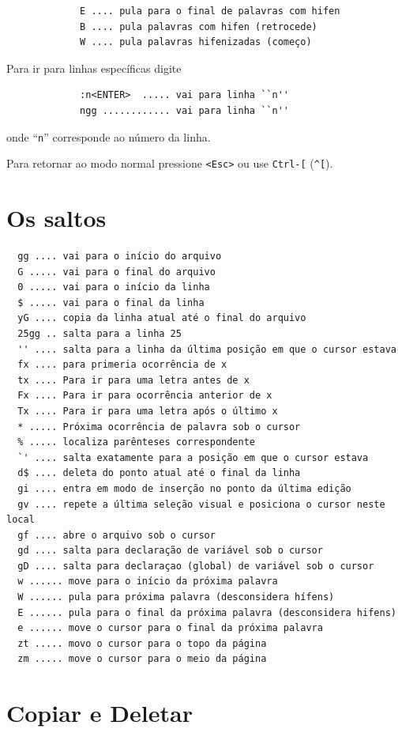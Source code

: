 \documentclass[10pt,a4paper,openany]{book}
\begin{document}
\begin{verbatim}
			 E .... pula para o final de palavras com hifen
			 B .... pula palavras com hifen (retrocede)
			 W .... pula palavras hifenizadas (começo)
\end{verbatim}



Para ir para linhas específicas digite

\begin{verbatim}
			 :n<ENTER>  ..... vai para linha ``n''
			 ngg ............ vai para linha ``n''
\end{verbatim}

onde ``\verb|n|'' corresponde ao número da linha.

Para retornar ao modo normal pressione \verb|<Esc>| ou use \verb|Ctrl-[|
(\verb|^[|).

\section{Os saltos}\label{Os saltos}

\begin{verbatim}
  gg .... vai para o início do arquivo
  G ..... vai para o final do arquivo
  0 ..... vai para o início da linha
  $ ..... vai para o final da linha
  yG .... copia da linha atual até o final do arquivo
  25gg .. salta para a linha 25
  '' .... salta para a linha da última posição em que o cursor estava
  fx .... para primeria ocorrência de x
  tx .... Para ir para uma letra antes de x
  Fx .... Para ir para ocorrência anterior de x
  Tx .... Para ir para uma letra após o último x
  * ..... Próxima ocorrência de palavra sob o cursor
  % ..... localiza parênteses correspondente
  `' .... salta exatamente para a posição em que o cursor estava
  d$ .... deleta do ponto atual até o final da linha
  gi .... entra em modo de inserção no ponto da última edição
  gv .... repete a última seleção visual e posiciona o cursor neste local
  gf .... abre o arquivo sob o cursor
  gd .... salta para declaração de variável sob o cursor
  gD .... salta para declaraçao (global) de variável sob o cursor
  w ...... move para o início da próxima palavra
  W ...... pula para próxima palavra (desconsidera hífens)
  E ...... pula para o final da próxima palavra (desconsidera hifens)
  e ...... move o cursor para o final da próxima palavra
  zt ..... movo o cursor para o topo da página
  zm ..... move o cursor para o meio da página
\end{verbatim}

\section{Copiar e Deletar}\label{sec:Copiar e Deletar}
\end{document}
